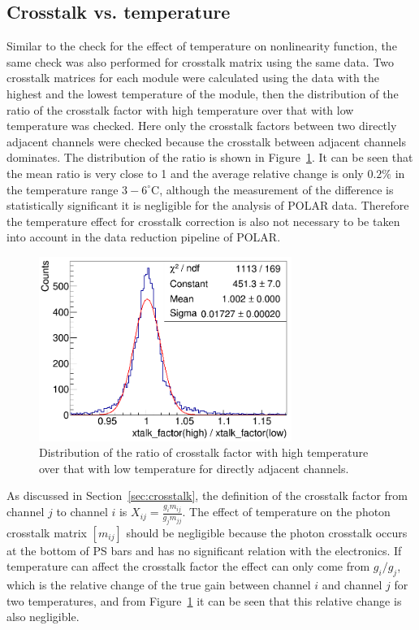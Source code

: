 \documentclass[preprint,sort&compress,12pt]{elsarticle}
\begin{document}
\subsection{Crosstalk vs. temperature}

Similar to the check for the effect of temperature on nonlinearity function, the same check was also performed for crosstalk matrix using the same data. Two crosstalk matrices for each module were calculated using the data with the highest and the lowest temperature of the module, then the distribution of the ratio of the crosstalk factor with high temperature over that with low temperature was checked. Here only the crosstalk factors between two directly adjacent channels were checked because the crosstalk between adjacent channels dominates. The distribution of the ratio is shown in Figure~\ref{fig:xtalk_factor_temp}. It can be seen that the mean ratio is very close to 1 and the average relative change is only $0.2\%$ in the temperature range $3-6^\circ\mathrm{C}$, although the measurement of the difference is statistically significant it is negligible for the analysis of POLAR data. Therefore the temperature effect for crosstalk correction is also not necessary to be taken into account in the data reduction pipeline of POLAR.

\begin{figure}[!ht]
\centering
\includegraphics[height=6cm]{images/xtalk_factor_temp.png}
\caption{Distribution of the ratio of crosstalk factor with high temperature over that with low temperature for directly adjacent channels.}\label{fig:xtalk_factor_temp}
\end{figure}

As discussed in Section~\ref{sec:crosstalk}, the definition of the crosstalk factor from channel $j$ to channel $i$ is $X_{ij} = \frac{g_i m_{ij}}{g_j m_{jj}}$. The effect of temperature on the photon crosstalk matrix $[m_{ij}]$ should be negligible because the photon crosstalk occurs at the bottom of PS bars and has no significant relation with the electronics. If temperature can affect the crosstalk factor the effect can only come from $g_i/g_j$, which is the relative change of the true gain between channel $i$ and channel $j$ for two temperatures, and from Figure~\ref{fig:xtalk_factor_temp} it can be seen that this relative change is also negligible.
\end{document}
